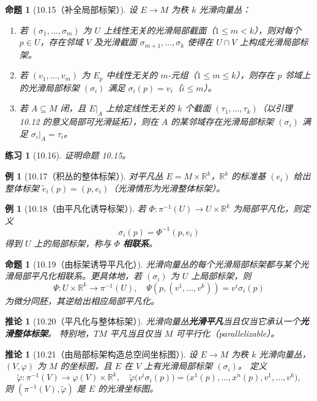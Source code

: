 \documentclass[12pt]{article}
\newtheorem{proposition}[definition]{命题}
\newtheorem{corollary}[definition]{推论}
\newtheorem{example}[definition]{例}
\newtheorem{exercise}[definition]{练习}
\begin{document}
\begin{proposition}[10.15（补全局部标架）]
设 $E\to M$ 为秩 $k$ 光滑向量丛：
\begin{enumerate}[label=(\alph*)]
\item 若 $(\sigma_1,\dots,\sigma_m)$ 为 $U$ 上线性无关的光滑局部截面（$1\le m<k$），则对每个 $p\in U$，存在邻域 $V$ 及光滑截面 $\sigma_{m+1},\dots,\sigma_k$ 使得在 $U\cap V$ 上构成光滑局部标架。
\item 若 $(v_1,\dots,v_m)$ 为 $E_p$ 中线性无关的 $m$-元组（$1\le m\le k$），则存在 $p$ 邻域上的光滑局部标架 $(\sigma_i)$ 满足 $\sigma_i(p)=v_i$（$i\le m$）。
\item 若 $A\subseteq M$ 闭，且 $E|_A$ 上给定线性无关的 $k$ 个截面 $(\tau_1,\dots,\tau_k)$（以引理 10.12 的意义局部可光滑延拓），则在 $A$ 的某邻域存在光滑局部标架 $(\sigma_i)$ 满足 $\sigma_i|_A=\tau_i$。
\end{enumerate}
\end{proposition}

\begin{exercise}[10.16]
证明命题 10.15。
\end{exercise}

\begin{example}[10.17（积丛的整体标架）]
对平凡丛 $E=M\times\mathbb{R}^k$，$\mathbb{R}^k$ 的标准基 $(e_i)$ 给出整体标架 $\tilde e_i(p)=(p,e_i)$（光滑情形为光滑整体标架）。
\end{example}

\begin{example}[10.18（由平凡化诱导标架）]
若 $\Phi:\pi^{-1}(U)\to U\times\mathbb{R}^k$ 为局部平凡化，则定义
\[
\sigma_i(p)=\Phi^{-1}(p,e_i)
\]
得到 $U$ 上的局部标架，称与 $\Phi$ \textbf{相联系}。
\end{example}

\begin{proposition}[10.19（由标架诱导平凡化）]
光滑向量丛的每个光滑局部标架都与某个光滑局部平凡化相联系。更具体地，若 $(\sigma_i)$ 为 $U$ 上局部标架，则
\[
\Psi:U\times\mathbb{R}^k\to \pi^{-1}(U),\quad \Psi(p,(v^1,\dots,v^k))=v^i\sigma_i(p)
\]
为微分同胚，其逆给出相应局部平凡化。
\end{proposition}

\begin{corollary}[10.20（平凡化与整体标架）]
光滑向量丛\textbf{光滑平凡}当且仅当它承认一个\textbf{光滑整体标架}。
特别地，$TM$ 平凡当且仅当 $M$ 可平行化（parallelizable）。
\end{corollary}

\begin{corollary}[10.21（由局部标架构造总空间坐标图）]
设 $E\to M$ 为秩 $k$ 光滑向量丛，$(V,\varphi)$ 为 $M$ 的坐标图，且 $E$ 在 $V$ 上有光滑局部标架 $(\sigma_i)$。
定义
\[
\tilde\varphi:\pi^{-1}(V)\to \varphi(V)\times\mathbb{R}^k,\quad 
\tilde\varphi\bigl(v^i\sigma_i(p)\bigr)=\bigl(x^1(p),\dots,x^n(p),v^1,\dots,v^k\bigr),
\]
则 $(\pi^{-1}(V),\tilde\varphi)$ 是 $E$ 的光滑坐标图。
\end{corollary}
\end{document}
